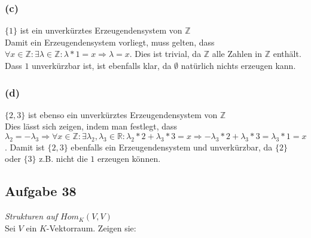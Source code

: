 \documentclass[12pt]{article}
\begin{document}
\subsubsection*{(c)}$\{1\}$ ist ein unverk{\"u}rztes Erzeugendensystem von $\mathbb{Z}$\\
Damit ein Erzeugendensystem vorliegt, muss gelten, dass $\forall x \in \mathbb{Z}: \exists \lambda \in \mathbb{Z}: \lambda * 1 = x \Rightarrow \lambda = x$. Dies ist trivial, da $\mathbb{Z}$ alle Zahlen in $\mathbb{Z}$ enthält. Dass ${1}$ unverkürzbar ist, ist ebenfalls klar, da $\emptyset$ nat{\"u}rlich nichts erzeugen kann.
\subsubsection*{(d)}$\{2,3\}$ ist ebenso ein unverk{\"u}rztes Erzeugendensystem von $\mathbb{Z}$\\
Dies l{\"a}sst sich zeigen, indem man festlegt, dass $\lambda_2=-\lambda_3 \Rightarrow \forall x \in \mathbb{Z}: \exists \lambda_2,\lambda_3 \in \mathbb{R}: \lambda_2*2+\lambda_3*3=x \Rightarrow -\lambda_3*2+\lambda_3*3=\lambda_3*1=x$. Damit ist $\{2,3\}$ ebenfalls ein Erzeugendensystem und unverk{\"u}rzbar, da $\{2\}$ oder $\{3\}$ z.B. nicht die $1$ erzeugen k{\"o}nnen.
\subsection*{\textbf{Aufgabe 38}}\textit{Strukturen auf $Hom_K(V,V)$}\\
Sei $V$ ein $K$-Vektorraum. Zeigen sie:
\end{document}
